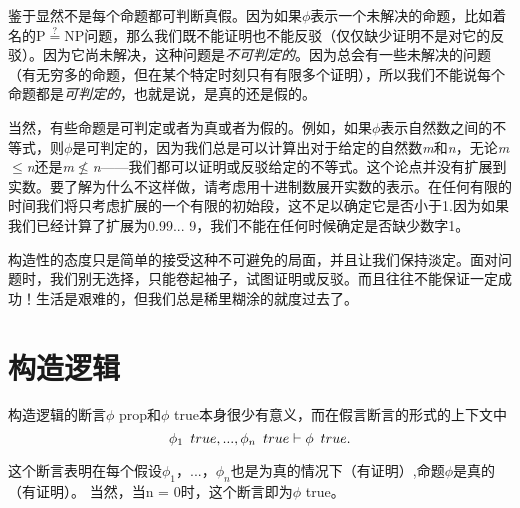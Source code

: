 鉴于显然不是每个命题都可判断真假。因为如果${\phi}$表示一个未解决的命题，比如着名的P${\stackrel{?}{=}}$NP问题，那么我们既不能证明也不能反驳（仅仅缺少证明不是对它的反驳）。因为它尚未解决，这种问题是\textit{不可判定的}。因为总会有一些未解决的问题（有无穷多的命题，但在某个特定时刻只有有限多个证明），所以我们不能说每个命题都是\textit{可判定的}，也就是说，是真的还是假的。


当然，有些命题是可判定或者为真或者为假的。例如，如果${\phi}$表示自然数之间的不等式，则${\phi}$是可判定的，因为我们总是可以计算出对于给定的自然数\textit{m}和\textit{n}，无论\textit{m}${\leq}$\textit{n}还是\textit{m}${\not\leq}$\textit{n}——我们都可以证明或反驳给定的不等式。这个论点并没有扩展到实数。要了解为什么不这样做，请考虑用十进制数展开实数的表示。在任何有限的时间我们将只考虑扩展的一个有限的初始段，这不足以确定它是否小于1.因为如果我们已经计算了扩展为0.99... 9，我们不能在任何时候确定是否缺少数字1。


构造性的态度只是简单的接受这种不可避免的局面，并且让我们保持淡定。面对问题时，我们别无选择，只能卷起袖子，试图证明或反驳。而且往往不能保证一定成功！生活是艰难的，但我们总是稀里糊涂的就度过去了。
\section{构造逻辑}
构造逻辑的断言${\phi}$ prop和${\phi}$ true本身很少有意义，而在假言断言的形式的上下文中
$$\phi_1\hspace{0.5em}true,...,\phi_n\hspace{0.5em}true \vdash \phi\hspace{0.5em}true.$$


这个断言表明在每个假设${\phi_1}$，...，${\phi_n}$也是为真的情况下（有证明）,命题${\phi}$是真的（有证明）。 当然，当n = 0时，这个断言即为${\phi}$ true。

